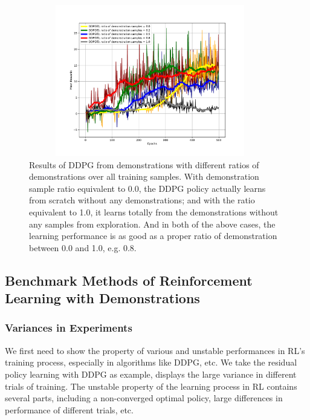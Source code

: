 \documentclass{article}
\begin{document}
\begin{figure}[htbp]
	\centering
	\includegraphics[height=250, width=400]{img/ddpgfd2.pdf}
	\caption{Results of DDPG from demonstrations with different ratios of demonstrations over all training samples. With demonstration sample ratio equivalent to 0.0, the DDPG policy actually learns from scratch without any demonstrations; and with the ratio equivalent to 1.0, it learns totally from the demonstrations without any samples from exploration. And in both of the above cases, the learning performance is as good as a proper ratio of demonstration between 0.0 and 1.0, e.g. 0.8.}
	\label{fig:ddpgfd2}
\end{figure}

\subsection{Benchmark Methods of Reinforcement Learning with Demonstrations}
\subsubsection{Variances in Experiments}
We first need to show the property of various and unstable performances in RL's training process, especially in algorithms like DDPG, etc. We take the residual policy learning with DDPG as example, displays the large variance in different trials of training. The unstable property of the learning process in RL contains several parts, including a non-converged optimal policy, large differences in performance of different trials, etc.
\end{document}

